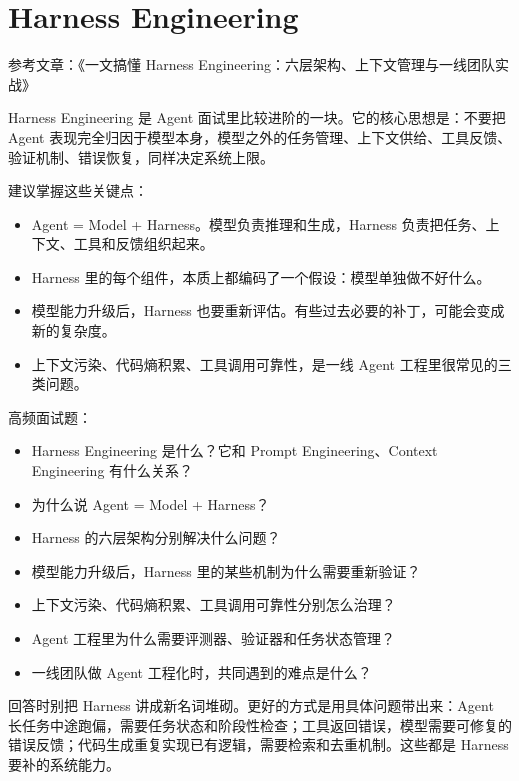 \documentclass[9pt,a4paper,twocolumn]{ctexart}
\begin{document}
\section*{Harness Engineering}


参考文章：《一文搞懂 Harness Engineering：六层架构、上下文管理与一线团队实战》



Harness Engineering 是 Agent 面试里比较进阶的一块。它的核心思想是：不要把 Agent 表现完全归因于模型本身，模型之外的任务管理、上下文供给、工具反馈、验证机制、错误恢复，同样决定系统上限。



建议掌握这些关键点：


\begin{itemize}[itemsep=1pt, topsep=2pt]
  \item Agent = Model + Harness。模型负责推理和生成，Harness 负责把任务、上下文、工具和反馈组织起来。
  \item Harness 里的每个组件，本质上都编码了一个假设：模型单独做不好什么。
  \item 模型能力升级后，Harness 也要重新评估。有些过去必要的补丁，可能会变成新的复杂度。
  \item 上下文污染、代码熵积累、工具调用可靠性，是一线 Agent 工程里很常见的三类问题。
\end{itemize}


高频面试题：


\begin{itemize}[itemsep=1pt, topsep=2pt]
  \item Harness Engineering 是什么？它和 Prompt Engineering、Context Engineering 有什么关系？
  \item 为什么说 Agent = Model + Harness？
  \item Harness 的六层架构分别解决什么问题？
  \item 模型能力升级后，Harness 里的某些机制为什么需要重新验证？
  \item 上下文污染、代码熵积累、工具调用可靠性分别怎么治理？
  \item Agent 工程里为什么需要评测器、验证器和任务状态管理？
  \item 一线团队做 Agent 工程化时，共同遇到的难点是什么？
\end{itemize}


回答时别把 Harness 讲成新名词堆砌。更好的方式是用具体问题带出来：Agent 长任务中途跑偏，需要任务状态和阶段性检查；工具返回错误，模型需要可修复的错误反馈；代码生成重复实现已有逻辑，需要检索和去重机制。这些都是 Harness 要补的系统能力。
\end{document}
